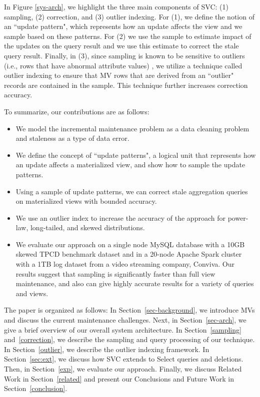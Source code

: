 In Figure \ref{sys-arch}, we highlight the three main components of SVC: (1) sampling, (2) correction, and (3) outlier indexing. For (1), we define the notion of an ``update pattern", which represents how an update affects the view and we sample based on these patterns. For (2) we use the sample to estimate impact of the updates on the query result and we use this estimate to correct the stale query result.
Finally, in (3), since sampling is known to be sensitive to outliers (i.e., rows that have abnormal attribute values) \cite{chaudhuri2001overcoming}, we
utilize a technique called outlier indexing \cite{chaudhuri2001overcoming} to ensure that MV rows that are derived from an ``outlier" records are contained in the sample.  This technique further increases correction accuracy.

To summarize, our contributions are as follows:
\begin{itemize}\vspace{-.45em}
\item We model the incremental maintenance problem as a data cleaning problem and staleness as a type of data error.\vspace{-.45em}
\item We define the concept of ``update patterns", a logical unit that represents how an update affects a materialized view, and show how to sample the update patterns. \vspace{-.45em}
\item Using a sample of update patterns, we can correct stale aggregation queries on materialized views with bounded accuracy.\vspace{-.45em}
\item We use an outlier index to increase the accuracy of the approach for power-law, long-tailed, and skewed distributions.\vspace{-.45em}
\item We evaluate our approach on a single node MySQL database with a 10GB skewed TPCD benchmark dataset and in a 20-node Apache Spark cluster with a 1TB log dataset from a video streaming company, Conviva. Our results suggest that sampling is significantly faster than full view maintenance, and also can give highly accurate results for a variety of queries and views.\vspace{-.45em}
\end{itemize}

The paper is organized as follows: 
In Section~\ref{sec-background}, we introduce MVs and discuss the current maintenance challenges.
Next, in Section~\ref{sec-arch}, we give a brief overview of our overall system architecture.
In Section~\ref{sampling} and~\ref{correction}, we describe the sampling and query processing of our technique.
In Section~\ref{outlier}, we describe the outlier indexing framework.
In Section~\ref{sec:ext}, we discuss how SVC extends to Select queries and deletions.
Then, in Section~\ref{exp}, we evaluate our approach.
Finally, we discuss Related Work in Section~\ref{related} and present our Conclusions and Future Work in Section~\ref{conclusion}.
